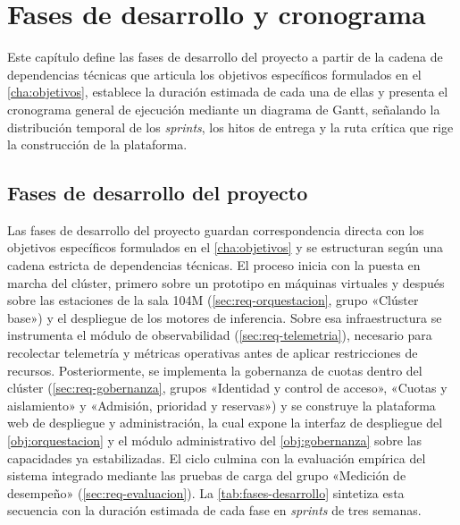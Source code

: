 %
\chapter{Fases de desarrollo y cronograma}\label{cha:fases-cronograma}

Este capítulo define las fases de desarrollo del proyecto a partir de la cadena de dependencias técnicas que articula los objetivos específicos formulados en el \cref{cha:objetivos}, establece la duración estimada de cada una de ellas y presenta el cronograma general de ejecución mediante un diagrama de Gantt, señalando la distribución temporal de los \emph{sprints}, los hitos de entrega y la ruta crítica que rige la construcción de la plataforma.

\section{Fases de desarrollo del proyecto}
\label{sec:fases-desarrollo}

Las fases de desarrollo del proyecto guardan correspondencia directa con los objetivos específicos formulados en el \cref{cha:objetivos} y se estructuran según una cadena estricta de dependencias técnicas. El proceso inicia con la puesta en marcha del clúster, primero sobre un prototipo en máquinas virtuales y después sobre las estaciones de la sala 104M (\cref{sec:req-orquestacion}, grupo «Clúster base») y el despliegue de los motores de inferencia. Sobre esa infraestructura se instrumenta el módulo de observabilidad (\cref{sec:req-telemetria}), necesario para recolectar telemetría y métricas operativas antes de aplicar restricciones de recursos. Posteriormente, se implementa la gobernanza de cuotas dentro del clúster (\cref{sec:req-gobernanza}, grupos «Identidad y control de acceso», «Cuotas y aislamiento» y «Admisión, prioridad y reservas») y se construye la plataforma web de despliegue y administración, la cual expone la interfaz de despliegue del \cref{obj:orquestacion} y el módulo administrativo del \cref{obj:gobernanza} sobre las capacidades ya estabilizadas. El ciclo culmina con la evaluación empírica del sistema integrado mediante las pruebas de carga del grupo «Medición de desempeño» (\cref{sec:req-evaluacion}). La \cref{tab:fases-desarrollo} sintetiza esta secuencia con la duración estimada de cada fase en \emph{sprints} de tres semanas.

